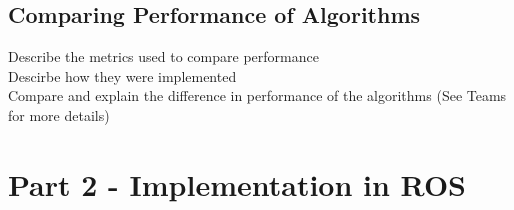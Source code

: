 \documentclass[a4paper,12pt]{article}
\begin{document}
			\subsection{Comparing Performance of Algorithms}

		Describe the metrics used to compare performance \\
		Descirbe how they were implemented \\
		Compare and explain the difference in performance of the algorithms (See Teams for more details)


	\section{Part 2 - Implementation in ROS}
	
\end{document}
